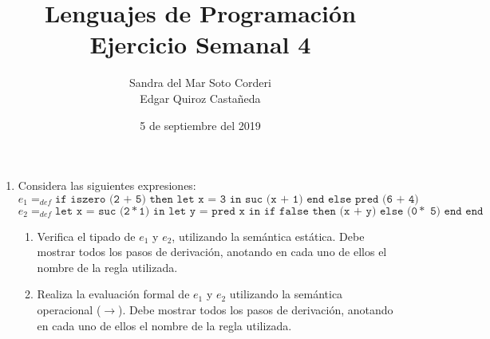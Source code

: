 \documentclass{article}
\begin{document}
    \title{
        Lenguajes de Programación \\
        Ejercicio Semanal 4
    }

    \author{
        Sandra del Mar Soto Corderi \\
        Edgar Quiroz Castañeda
    }

    \date{
        5 de septiembre del 2019
    }
    
    \maketitle

    \begin{enumerate}
        \item {
            Considera las siguientes expresiones:\\
                            
            	$e_1 =_{def} \texttt{if iszero (2 + 5) then let x = 3 in suc (x + 1) end else pred (6 + 4)}$\\
            	
            	$e_2 =_{def} \texttt{let x = suc (2} \ast \texttt{1) in let y = pred x in if false then (x + y) else (0} \ast \texttt{ 5) end end}$\\
            
            \begin{enumerate}
            	\item {
            	Verifica el tipado de $e_1$ y $e_2$, utilizando la semántica estática. Debe mostrar todos los pasos de derivación,        	anotando en cada uno de ellos el nombre de la regla utilizada.
            	
            	}
            	
            	\item {
            	Realiza la evaluación formal de $e_1$ y $e_2$ utilizando la semántica operacional ($\rightarrow$). Debe mostrar todos los pasos de derivación, anotando en cada uno de ellos el nombre de la regla utilizada.
            	}
            \end{enumerate}
        }
    \end{enumerate}
\end{document}
